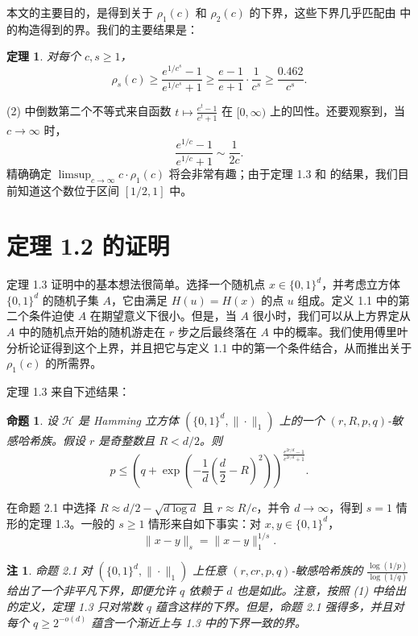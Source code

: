 \documentclass[10pt,twocolumn]{ctexart}
\newtheorem{theorem}{定理}
\newtheorem{proposition}{命题}
\newtheorem{remark}{注}
\begin{document}
本文的主要目的，是得到关于 $\rho_1(c)$ 和 $\rho_2(c)$ 的下界，这些下界几乎匹配由 \cite{IM98,DIM04,AI05} 中的构造得到的界。我们的主要结果是：

\begin{theorem}
对每个 $c,s\ge 1$，
\begin{equation}
\rho_s(c)\ge
\frac{e^{1/c^s}-1}{e^{1/c^s}+1}
\ge
\frac{e-1}{e+1}\cdot\frac{1}{c^s}
\ge
\frac{0.462}{c^s}.
\end{equation}
\end{theorem}

(2) 中倒数第二个不等式来自函数 $t\mapsto \frac{e^t-1}{e^t+1}$ 在 $[0,\infty)$ 上的凹性。还要观察到，当 $c\to\infty$ 时，
\[
\frac{e^{1/c}-1}{e^{1/c}+1}\sim \frac{1}{2c}.
\]
精确确定 $\limsup_{c\to\infty} c\cdot\rho_1(c)$ 将会非常有趣；由于定理 1.3 和 \cite{IM98} 的结果，我们目前知道这个数位于区间 $[1/2,1]$ 中。

\section{定理 1.2 的证明}

定理 1.3 证明中的基本想法很简单。选择一个随机点 $x\in\{0,1\}^d$，并考虑立方体 $\{0,1\}^d$ 的随机子集 $A$，它由满足 $H(u)=H(x)$ 的点 $u$ 组成。定义 1.1 中的第二个条件迫使 $A$ 在期望意义下很小。但是，当 $A$ 很小时，我们可以从上方界定从 $A$ 中的随机点开始的随机游走在 $r$ 步之后最终落在 $A$ 中的概率。我们使用傅里叶分析论证得到这个上界，并且把它与定义 1.1 中的第一个条件结合，从而推出关于 $\rho_1(c)$ 的所需界。

定理 1.3 来自下述结果：

\begin{proposition}
设 $\mathcal{H}$ 是 Hamming 立方体 $(\{0,1\}^d,\|\cdot\|_1)$ 上的一个 $(r,R,p,q)$-敏感哈希族。假设 $r$ 是奇整数且 $R<d/2$。则
\[
p\le
\left(q+\exp\left(-\frac{1}{d}\left(\frac{d}{2}-R\right)^2\right)\right)^{
\frac{e^{2r/d}-1}{e^{2r/d}+1}
}.
\]
\end{proposition}

在命题 2.1 中选择 $R\approx d/2-\sqrt{d\log d}$ 且 $r\approx R/c$，并令 $d\to\infty$，得到 $s=1$ 情形的定理 1.3。一般的 $s\ge 1$ 情形来自如下事实：对 $x,y\in\{0,1\}^d$，
\[
\|x-y\|_s=\|x-y\|_1^{1/s}.
\]

\begin{remark}
命题 2.1 对 $(\{0,1\}^d,\|\cdot\|_1)$ 上任意 $(r,cr,p,q)$-敏感哈希族的 $\frac{\log(1/p)}{\log(1/q)}$ 给出了一个非平凡下界，即便允许 $q$ 依赖于 $d$ 也是如此。注意，按照 (1) 中给出的定义，定理 1.3 只对常数 $q$ 蕴含这样的下界。但是，命题 2.1 强得多，并且对每个 $q\ge 2^{-o(d)}$ 蕴含一个渐近上与 1.3 中的下界一致的界。
\end{remark}
\end{document}
